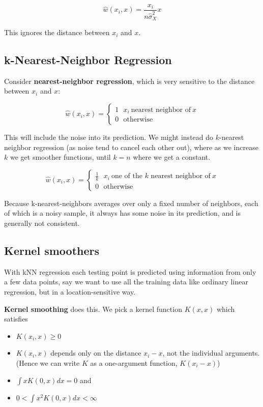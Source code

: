 \documentclass{article}
\begin{document}
$$
\hat{w}(x_i, x) = \frac{x_i}{n \hat{\sigma}^2_X} x
$$

This ignores the distance between $x_i$ and $x$.

\subsection{k-Nearest-Neighbor Regression}

Consider \textbf{nearest-neighbor regression}, which is very sensitive to the distance between $x_i$ and $x$:

$$
\hat{w}(x_i, x) = 
\begin{cases}
1 ~ ~ ~ x_i ~ \text{nearest neighbor of} ~ x \\
0 ~ ~ ~ \text{otherwise}
\end{cases}
$$

This will include the noise into its prediction.
We might instead do $k$-nearest neighbor regression (as noise tend to cancel each other out), where as we increase $k$ we get smoother functions, until $k = n$ where we get a constant.

$$
\hat{w}(x_i, x) = 
\begin{cases}
\frac{1}{k} ~ ~ ~ x_i ~ \text{one of the $k$ nearest neighbor of} ~ x \\
0 ~ ~ ~ \text{otherwise}
\end{cases}
$$

Because k-nearest-neighbors averages over only a fixed number of neighbors, each of which is a noisy sample, it always has some noise in its prediction, and is generally not consistent.

\subsection{Kernel smoothers}

With kNN regression each testing point is predicted using information from only a few data points, say we want to use all the training data like ordinary linear regression, but in a location-sensitive way.

\textbf{Kernel smoothing} does this.
We pick a kernel function $K(x, x)$ which satisfies
\begin{itemize}
  \item $K(x_i, x) \geq 0$
  \item $K(x_i, x)$ depends only on the distance $x_i - x$, not the individual arguments. (Hence we can write $K$ as a one-argument function, $K(x_i - x)$)
  \item $\int{x K(0, x) dx} = 0$ and
  \item $0 < \int{x^2 K(0, x) dx} < \infty$
\end{itemize}
\end{document}
